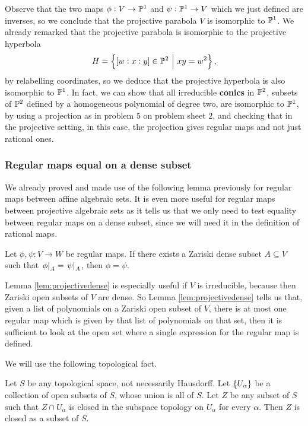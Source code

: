 Observe that the two maps $ \phi : V \to \mathbb{P}^1 $ and $ \psi : \mathbb{P}^1 \to V $ which we just defined are inverses, so we conclude that the projective parabola $ V $ is isomorphic to $ \mathbb{P}^1 $. We already remarked that the projective parabola is isomorphic to the projective hyperbola
$$ H = \cbr{\sbr{w : x : y} \in \PP^2 \st xy = w^2}, $$
by relabelling coordinates, so we deduce that the projective hyperbola is also isomorphic to $ \mathbb{P}^1 $. In fact, we can show that all irreducible \textbf{conics} in $ \mathbb{P}^2 $, subsets of $ \mathbb{P}^2 $ defined by a homogeneous polynomial of degree two, are isomorphic to $ \mathbb{P}^1 $, by using a projection as in problem $ 5 $ on problem sheet $ 2 $, and checking that in the projective setting, in this case, the projection gives regular maps and not just rational ones.

\subsubsection{Regular maps equal on a dense subset}

We already proved and made use of the following lemma previously for regular maps between affine algebraic sets. It is even more useful for regular maps between projective algebraic sets as it tells us that we only need to test equality between regular maps on a dense subset, since we will need it in the definition of rational maps.

\begin{lemma}
\label{lem:projectivedense}
Let $ \phi, \psi : V \to W $ be regular maps. If there exists a Zariski dense subset $ A \subseteq V $ such that $ \left. \phi \right|_A = \left. \psi \right|_A $, then $ \phi = \psi $.
\end{lemma}

\begin{example*}
Lemma \ref{lem:projectivedense} is especially useful if $ V $ is irreducible, because then Zariski open subsets of $ V $ are dense. So Lemma \ref{lem:projectivedense} tells us that, given a list of polynomials on a Zariski open subset of $ V $, there is at most one regular map which is given by that list of polynomials on that set, then it is sufficient to look at the open set where a single expression for the regular map is defined.
\end{example*}

\pagebreak

We will use the following topological fact.

\begin{fact*}
Let $ S $ be any topological space, not necessarily Hausdorff. Let $ \cbr{U_\alpha} $ be a collection of open subsets of $ S $, whose union is all of $ S $. Let $ Z $ be any subset of $ S $ such that $ Z \cap U_\alpha $ is closed in the subspace topology on $ U_\alpha $ for every $ \alpha $. Then $ Z $ is closed as a subset of $ S $.
\end{fact*}


